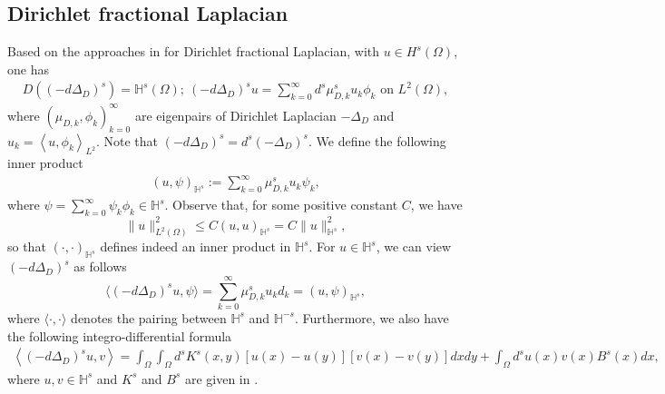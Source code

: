 \documentclass[a4paper,11pt]{amsart}
\theoremstyle{definition}
\def\O{\Omega}
\numberwithin{equation}{section}
\theoremstyle{definition}
\def\O{\Omega}
\begin{document}
\subsection{\bf Dirichlet fractional Laplacian}
Based on the approaches in \cite{caffarelli_fractional_2016} for Dirichlet fractional Laplacian, with $u\in H^s(\O)$, one has 
\begin{align*}
D((-d\Delta_D)^{s})=\mathbb{H}^s(\O);~
(-d\Delta_D)^{s}u=\sum_{k=0}^\infty d^s\mu_{D,k}^su_k\phi_k \text{ on }L^2(\O),
\end{align*}
where $(\mu_{D,k},\phi_k)^\infty_{k=0}$ are eigenpairs of Dirichlet Laplacian $-\Delta_D$ and $u_k=\left<u,\phi_k\right>_{L^2}$. Note that $(-d\Delta_D)^{s}=d^s(-\Delta_D)^{s}$. We define the following inner product
\begin{align}\label{eigen:ex}
(u, \psi)_{\mathbb{H}^s} := \sum_{k=0}^\infty \mu_{D,k}^s u_k \psi_k,
\end{align}
where $\psi = \sum\limits_{k=0}^\infty \psi_k \phi_k \in \mathbb{H}^s$. Observe that, for some positive constant $C$, we have 
\[
\|u\|_{L^2(\Omega)}^2 \leq C (u, u)_{\mathbb{H}^s} = C \|u\|_{\mathbb{H}^s}^2,
\] 
so that $(\cdot, \cdot)_{\mathbb{H}^s}$ defines indeed an inner product in $\mathbb{H}^s$. For $u \in \mathbb{H}^s$, we can view $(-d\Delta_D)^{s}$ as follows
\[
\langle (-d\Delta_D)^{s} u, \psi \rangle = \sum_{k=0}^\infty \mu_{D,k}^s u_k d_k = (u, \psi)_{\mathbb{H}^s},
\]
where $\langle \cdot, \cdot \rangle$ denotes the pairing between $\mathbb{H}^s$ and $\mathbb{H}^{-s}$. 
Furthermore, we also have the following integro-differential formula
\begin{align*}
\left<(-d\Delta_D)^{s}u,v\right>=\int_{\O}\int_{\O}d^sK^{s}(x,y)[u(x)-u(y)][v(x)-v(y)]dxdy+\int_{\O}d^s u(x)v(x)B^s(x)dx,
\end{align*}
where $u,v\in \mathbb{H}^s$ and $K^{s}$ and $B^{s}$ are given in \cite[Theorem 2.3]{caffarelli_fractional_2016}.
\end{document}
